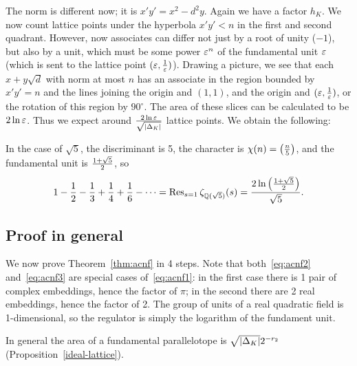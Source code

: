 \begin{enumerate}
The norm is different now; it is $x'y'=x^2-d^2y$. Again we have a factor $h_K$. We now count lattice points under the hyperbola $x'y'<n$ in the first and second quadrant. However, now associates can differ not just by a root of unity ($-1$), but also by a unit, which must be some power $\varepsilon^n$ of the fundamental unit $\varepsilon$ (which is sent to the lattice point $(\varepsilon,\frac{1}{\varepsilon})$). Drawing a picture, we see that each $x+y\sqrt d$ with norm at most $n$ has an associate in the region bounded by $x'y'=n$ and the lines joining the origin and $(1,1)$, and the origin and $(\varepsilon,\frac{1}{\varepsilon})$, or the rotation of this region by $90^{\circ}$. The area of these slices can be calculated to be $2\ln \varepsilon$. Thus we expect around $\frac{2\ln \varepsilon}{\sqrt{|\Delta_K|}}$ lattice points. We obtain the following:


In the case of $\sqrt5$, the discriminant is 5, the character is $\chi(n)=\left( {\frac{n}{5}} \right)$, and the fundamental unit is $\frac{1+\sqrt{5}}{2}$, so 
\[
1-\frac{1}{2}-\frac{1}{3}+\frac{1}{4}+\frac{1}{6}-\cdots=\operatorname{Res}_{s=1}\zeta_{\mathbb{Q}(\sqrt{5})}(s)=\frac{2\ln \left( {\frac{1+\sqrt5}{2}} \right)}{\sqrt 5}.
\]
\end{enumerate}

\subsection{Proof in general}

We now prove Theorem~\ref{thm:acnf} in 4 steps. Note that both~\eqref{eq:acnf2} and~\eqref{eq:acnf3} are special cases of~\eqref{eq:acnf1}: in the first case there is 1 pair of complex embeddings, hence the factor of $\pi$; in the second there are 2 real embeddings, hence the factor of 2. The group of units of a real quadratic field is 1-dimensional, so the regulator is simply the logarithm of the fundament unit.%

In general the area of a fundamental parallelotope is $\sqrt{|\Delta_K|}2^{-r_2}$ (Proposition~\ref{ideal-lattice}).



